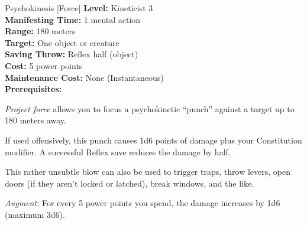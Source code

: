 {Psychokinesis [Force]}
{
	\textbf{Level:}
	Kineticist 3\\
	\textbf{Manifesting Time:}
	1 mental action\\
	\textbf{Range:}
	180 meters\\
	\textbf{Target:}
	One object or creature\\
	\textbf{Saving Throw:}
	Reflex half (object)\\
	\textbf{Cost:}
	5 power points\\
	\textbf{Maintenance Cost:}
	None (Instantaneous)\\
	\textbf{Prerequisites:}
	\\
}
{
	\emph{Project force} allows you to focus a psychokinetic ``punch'' against a target up to 180 meters away.

	If used offensively, this punch causes 1d6 points of damage plus your Constitution modifier. A successful Reflex save reduces the damage by half.

	This rather unsubtle blow can also be used to trigger traps, throw levers, open doors (if they aren't locked or latched), break windows, and the like.

	\textit{Augment:} For every 5 power points you spend, the damage increases by 1d6 (maximum 3d6).
}